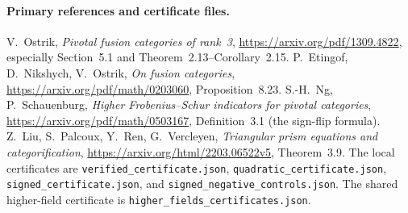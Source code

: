 \paragraph{Primary references and certificate files.}
V.~Ostrik, \emph{Pivotal fusion categories of rank~3},
\url{https://arxiv.org/pdf/1309.4822}, especially Section~5.1 and
Theorem~2.13--Corollary~2.15.
P.~Etingof, D.~Nikshych, V.~Ostrik, \emph{On fusion categories},
\url{https://arxiv.org/pdf/math/0203060}, Proposition~8.23.
S.-H.~Ng, P.~Schauenburg, \emph{Higher Frobenius--Schur indicators for
pivotal categories}, \url{https://arxiv.org/pdf/math/0503167},
Definition~3.1 (the sign-flip formula).
Z.~Liu, S.~Palcoux, Y.~Ren, G.~Vercleyen,
\emph{Triangular prism equations and categorification},
\url{https://arxiv.org/html/2203.06522v5}, Theorem~3.9.
The local certificates are \texttt{verified\_certificate.json},
\texttt{quadratic\_certificate.json}, \texttt{signed\_certificate.json},
and \texttt{signed\_negative\_controls.json}. The shared higher-field
certificate is \texttt{higher\_fields\_certificates.json}.
